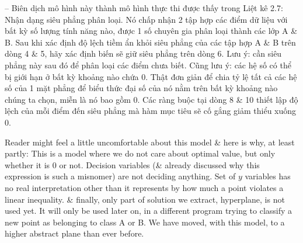 \documentclass{article}
\begin{document}
\begin{itemize}
\begin{itemize}
\begin{itemize}
            -- Biên dịch mô hình này thành mô hình thực thi được thấy trong {\sf Liệt kê 2.7: Nhận dạng siêu phẳng phân loại}. Nó chấp nhận 2 tập hợp các điểm dữ liệu với bất kỳ số lượng tính năng nào, được 1 số chuyên gia phân loại thành các lớp A \& B. Sau khi xác định độ lệch tiềm ẩn khỏi siêu phẳng của các tập hợp A \& B trên dòng 4 \& 5, hãy xác định biến sẽ giữ siêu phẳng trên dòng 6. Lưu ý: cần siêu phẳng này sau đó để phân loại các điểm chưa biết. Cũng lưu ý: các hệ số có thể bị giới hạn ở bất kỳ khoảng nào chứa 0. Thật đơn giản để chia tỷ lệ tất cả các hệ số của 1 mặt phẳng để biểu thức đại số của nó nằm trên bất kỳ khoảng nào chúng ta chọn, miễn là nó bao gồm 0. Các ràng buộc tại dòng 8 \& 10 thiết lập độ lệch của mỗi điểm đến siêu phẳng mà hàm mục tiêu sẽ cố gắng giảm thiểu xuống 0.

            Reader might feel a little uncomfortable about this model \& here is why, at least partly: This is a model where we do not care about optimal value, but only whether it is 0 or not. Decision variables (\& already discussed why this expression is such a misnomer) are not deciding anything. Set of $y$ variables has no real interpretation other than it represents by how much a point violates a linear inequality. \& finally, only part of solution we extract, hyperplane, is not used yet. It will only be used later on, in a different program trying to classify a new point as belonging to class A or B. We have moved, with this model, to a higher abstract plane than ever before.


\end{itemize}
\end{itemize}
\end{itemize}
\end{document}
